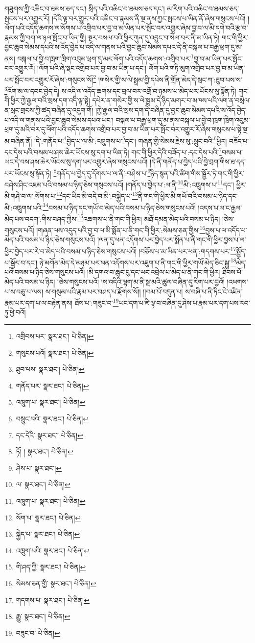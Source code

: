 གཟུགས་ཀྱི་འཆིང་བ་ཐམས་ཅད་དང་། སྲིད་པའི་འཆིང་བ་ཐམས་ཅད་དང་། མ་རིག་པའི་འཆིང་བ་ཐམས་ཅད་སྤངས་པར་འགྱུར་རོ། །དེའི་ལྟ་བར་གྱུར་པའི་འཆིང་བ་རྣམས་ནི་སྔ་ནས་ཀྱང་སྤངས་པ་ཡིན་ནོ་ཞེས་གསུངས་པའོ། །ལོག་པའི་འདོད་ཆགས་ལ་སོགས་པ་འགྲིབ་པར་བྱ་བ་མ་ཡིན་པར་སྤོང་བར་འགྱུར་ཞེས་བྱ་བ་ལ་མི་དགེ་བའི་རྩ་བ་རྣམས་ཀྱི་བག་ལ་ཉལ་སྤོང་བ་ཡིན་གྱི། སྔར་བསལ་བའི་ཕྱིར་ཀུན་དུ་འབྱུང་བ་སེལ་བར་ནི་མ་ཡིན་ཏེ། གང་གི་ཕྱིར་བྱང་ཆུབ་སེམས་དཔའི་ས་འོད་བྱེད་པ་འདི་ལ་གནས་པའི་བྱང་ཆུབ་སེམས་དཔའ་དེ་ནི་བསྐལ་པ་བརྒྱ་ཕྲག་དུ་མ་ནས། བསྐལ་པ་བྱེ་བ་ཁྲག་ཁྲིག་འབུམ་ཕྲག་དུ་མར་ལོག་པའི་འདོད་ཆགས་:འགྲིབ་པར་\footnote{འགྲིབས་པར་  སྣར་ཐང་།  པེ་ཅིན། }བྱ་བ་མ་ཡིན་པར་སྤོང་བར་འགྱུར་རོ། །ལོག་པའི་ཞེ་སྡང་འགྲིབ་པར་བྱ་བ་མ་ཡིན་པ་དང་། ལོག་པའི་གཏི་མུག་འགྲིབ་པར་བྱ་བ་མ་ཡིན་པར་སྤོང་བར་འགྱུར་རོ་ཞེས་:གསུངས་སོ།\footnote{གསུངས་པའོ།  སྣར་ཐང་།  པེ་ཅིན། } །གསེར་གྱི་ས་ལེ་སྦྲམ་གྱི་དཔེས་ནི་གྲོན་མེད་དེ་སྲང་ཀ་:ཐུབ་པས་ས་\footnote{ཐུབ་པས་  སྣར་ཐང་།  པེ་ཅིན། }འོག་མ་ལ་དབང་བྱེད་དེ། ས་འདི་ལ་འདོད་ཆགས་དང་བྲལ་བར་འགྲོ་བ་ཉམས་པ་མེད་པར་ཡོངས་སུ་སྟོན་ཏེ། གང་གི་ཕྱིར་ཀྱེ་རྒྱལ་བའི་སྲས་དག་འདི་ལྟ་སྟེ། དཔེར་ན་གསེར་གྱི་ས་ལེ་སྦྲམ་དེ་ཉིད་མགར་བ་མཁས་པའི་ལག་ན་བསྲེལ་ན་སྲང་གྲངས་ཀྱི་ཚད་བཞིན་དུ་འདུག་གོ། །ཀྱེ་རྒྱལ་བའི་སྲས་དག་དེ་བཞིན་དུ་བྱང་ཆུབ་སེམས་དཔའི་ས་འོད་བྱེད་པ་འདི་ལ་གནས་པའི་བྱང་ཆུབ་སེམས་དཔའ་ཡང་། བསྐལ་པ་བརྒྱ་ཕྲག་དུ་མ་ནས་བསྐལ་པ་བྱེ་བ་ཁྲག་ཁྲིག་འབུམ་ཕྲག་དུ་མའི་བར་དུ་ལོག་པའི་འདོད་ཆགས་འགྲིབ་པར་བྱ་བ་མ་ཡིན་པར་སྤོང་བར་འགྱུར་རོ་ཞེས་གསུངས་པ་སྟེ་སྔ་མ་བཞིན་ནོ། །དེ་:གནོད་པ་\footnote{གནོད་པར་  སྣར་ཐང་།  པེ་ཅིན། }བྱེད་པ་ལ་མི་:འཁྲུགས་པ་\footnote{འཁྲུག་པ་  སྣར་ཐང་།  པེ་ཅིན། }དང་། གཞན་གྱི་སེམས་རྗེས་སུ་:སྲུང་བའི་\footnote{བསྲུང་བའི་  སྣར་ཐང་།  པེ་ཅིན། }ཕྱིར། བཟོད་པ་དང་དེས་པའི་བསམ་པ་ཤས་ཆེར་ཡོངས་སུ་དག་པ་ཡིན་ཏེ། གང་གི་ཕྱིར་དེའི་བཟོད་པ་:དང་དེས་པའི་\footnote{དང་དེའི་  སྣར་ཐང་།  པེ་ཅིན། }བསམ་པ་ཡང་དེ་བས་ཤས་ཆེར་ཡོངས་སུ་དག་པར་འགྱུར་ཞེས་གསུངས་པའོ། །དེ་ནི་གནོད་པ་བྱེད་པའི་བྱེ་བྲག་གིས་ཐ་དད་པར་ཡོངས་སུ་སྟོན་ཏེ། \footnote{ཏོ། །   སྣར་ཐང་།  པེ་ཅིན། }གནོད་པ་བྱེད་དུ་དོགས་པ་ལ་ནི་:བཤེས་པ་\footnote{ཤེས་པ་  སྣར་ཐང་། }ཉིད་སྙན་པའི་ཚིག་གིས་སྦྱོར་ཏེ་གང་གི་ཕྱིར་བཤེས་ཤིང་འཇམ་པའི་བསམ་པ་ཉིད་ཅེས་གསུངས་པའོ། །གནོད་པ་བྱེད་པ་:ལ་ནི་\footnote{ལ་  སྣར་ཐང་།  པེ་ཅིན། }མི་:འཁྲུགས་པ་\footnote{འཁྲུག་པ་  སྣར་ཐང་།  པེ་ཅིན། }དང་། ཕྱིར་མི་གཤེ་བ་ལ་:སོགས་པ་\footnote{སོག་པ་  སྣར་ཐང་།  པེ་ཅིན། }དང་ཡིད་མི་བདེ་བ་མི་:བསྐྱེད་པ་\footnote{སྐྱེད་པ་  སྣར་ཐང་།  པེ་ཅིན། }ནི་གང་གི་ཕྱིར་མི་གཡོ་བའི་བསམ་པ་ཉིད་དང་མི་:འཁྲུགས་པའི་\footnote{འཁྲུག་པའི་  སྣར་ཐང་།  པེ་ཅིན། }བསམ་པ་ཉིད་དང་གཡོ་བ་མེད་པའི་བསམ་པ་ཉིད་ཅེས་གསུངས་པའོ། །འདས་པ་ལ་ང་རྒྱལ་མེད་པས་བདག་:གིས་བཤད་ཀྱིས་\footnote{གི་ཤད་ཀྱི་  སྣར་ཐང་།  པེ་ཅིན། }འཆགས་པ་ནི་གང་གི་ཕྱིར། མཐོ་དམན་མེད་པའི་བསམ་པ་ཉིད། །ཅེས་གསུངས་པའོ། །གཞན་ལས་འདུད་པའི་བྱ་བ་ལ་མི་སྨོན་པ་ནི་གང་གི་ཕྱིར་:སེམས་ཅན་གྱིས་\footnote{སེམས་ཅན་གྱི་  སྣར་ཐང་།  པེ་ཅིན། }བྱས་པ་ལ་འདོད་པ་མེད་པའི་བསམ་པ་ཉིད་ཅེས་གསུངས་པའོ། །ལན་དུ་ཕན་འདོགས་པར་བྱེད་པར་སྨོན་པ་ནི་གང་གི་ཕྱིར་བྱས་པ་ལ་ཕྱིར་བྱེད་པར་རེ་བ་མེད་པའི་བསམ་པ་ཉིད་ཅེས་གསུངས་པའོ། །བཅོས་པ་མ་ཡིན་པར་ཕན་:གདགས་པར་\footnote{གདགས་པ་  སྣར་ཐང་།  པེ་ཅིན། }སྤྱོད་པ་སྦྱོར་བ་དང་། ཉེ་མགོན་མེད་དེ་མཉམ་པར་ཕན་འདོགས་པར་འཇུག་པ་ནི་གང་གི་ཕྱིར་གཡོ་མེད་ཅིང་སྒྱུ་\footnote{རྒྱུ་  སྣར་ཐང་།  པེ་ཅིན། }མེད་པའི་བསམ་པ་ཉིད་ཅེས་གསུངས་པའོ། །མི་དགའ་བ་ཆུང་ངུ་དང་ཡང་འབྲེལ་པ་མེད་པ་ནི་གང་གི་ཕྱིར། ཐིབས་པོ་མེད་པའི་བསམ་པ་ཉིད། །ཅེས་གསུངས་པའོ། །ས་འདིའི་ལྷག་མ་ནི་སྔ་མའི་ཚུལ་བཞིན་དུ་རིག་པར་བྱའོ། །འཕགས་པ་ས་བཅུ་པ་ལས། ས་གསུམ་པའི་རྣམ་པར་བཤད་པ་རྫོགས་སོ།། །།བམ་པོ་བདུན་པ། ས་བཞི་པ་ནི་ཏིང་ངེ་འཛིན་རྣམ་པར་དག་པ་ལ་བརྟེན་ནས། ཐོས་པ་:གཟུང་བ་\footnote{བཟུང་བ་  པེ་ཅིན། }ཡང་དག་པ་ཇི་ལྟ་བ་བཞིན་དུ་ཤེས་པ་རྣམ་པར་དག་པས་རབ་ཏུ་ཕྱེ་བའོ། 